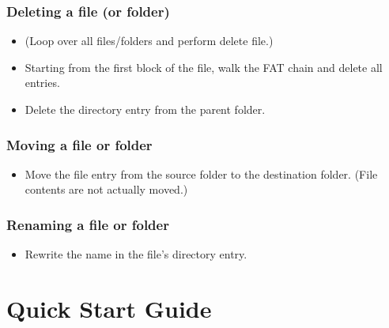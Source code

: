 \documentclass[11pt]{article}
\begin{document}
        \subsubsection{Deleting a file (or folder)}\label{deleting-a-file-or-folder}
            \begin{itemize}
                \itemsep1pt\parskip0pt
                \item{(Loop over all files/folders and perform delete file.)}
                \item{Starting from the first block of the file, walk the FAT chain and delete all entries.}
                \item{Delete the directory entry from the parent folder.}
            \end{itemize}

        \subsubsection{Moving a file or folder}\label{moving-a-file-or-folder}
            \begin{itemize}
                \itemsep1pt\parskip0pt
                \item{Move the file entry from the source folder to the destination folder. (File contents are not actually moved.)}
            \end{itemize}

        \subsubsection{Renaming a file or folder}\label{renaming-a-file-or-folder}
            \begin{itemize}
                \itemsep1pt\parskip0pt
                \item{Rewrite the name in the file's directory entry.}
            \end{itemize}


\setcounter{section}{4}

\section{Quick Start Guide}

\begin{thebibliography}{99}

\end{thebibliography}
\end{document}
